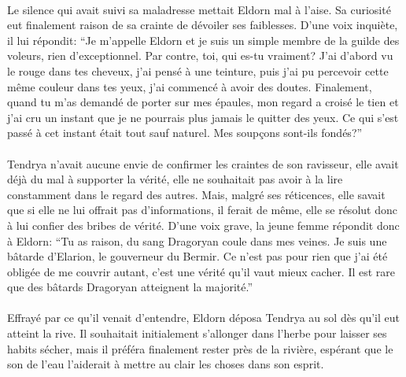 \paragraph{}
Le silence qui avait suivi sa maladresse mettait Eldorn mal à l'aise. Sa
curiosité eut finalement raison de sa crainte de dévoiler ses faiblesses.
D'une voix inquiète, il lui répondit: ``Je m'appelle Eldorn et je suis un
simple membre de la guilde des voleurs, rien d'exceptionnel. Par contre, toi,
qui es-tu vraiment? J'ai d'abord vu le rouge dans tes cheveux, j'ai pensé à
une teinture, puis j'ai pu percevoir cette même couleur dans tes yeux, j'ai
commencé à avoir des doutes. Finalement, quand tu m'as demandé de porter sur
mes épaules, mon regard a croisé le tien et j'ai cru un instant que je ne
pourrais plus jamais le quitter des yeux. Ce qui s'est passé à cet instant
était tout sauf naturel. Mes soupçons sont-ils fondés?''

\paragraph{}
Tendrya n'avait aucune envie de confirmer les craintes de son ravisseur, elle
avait déjà du mal à supporter la vérité, elle ne souhaitait pas avoir à la
lire constamment dans le regard des autres. Mais, malgré ses réticences, elle
savait que si elle ne lui offrait pas d'informations, il ferait de même, elle
se résolut donc à lui confier des bribes de vérité. D'une voix grave, la jeune
femme répondit donc à Eldorn: ``Tu as raison, du sang Dragoryan coule dans mes
veines. Je suis une bâtarde d'Elarion, le gouverneur du Bermir. Ce n'est pas
pour rien que j'ai été obligée de me couvrir autant, c'est une vérité qu'il
vaut mieux cacher. Il est rare que des bâtards Dragoryan atteignent la
majorité.''

\paragraph{}
Effrayé par ce qu'il venait d'entendre, Eldorn déposa Tendrya au sol dès qu'il
eut atteint la rive. Il souhaitait initialement s'allonger dans l'herbe pour
laisser ses habits sécher, mais il préféra finalement rester près de la
rivière, espérant que le son de l'eau l'aiderait à mettre au clair les choses
dans son esprit.

